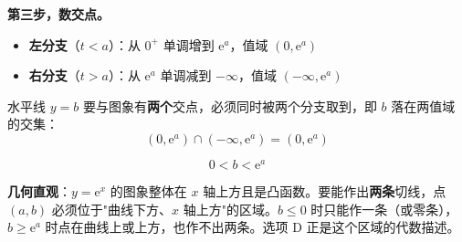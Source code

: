 \begin{answer}
\textbf{第三步，数交点。}

\begin{itemize}
\item \textbf{左分支}（$t<a$）：从 $0^{+}$ 单调增到 $\mathrm e^{a}$，值域 $\left(0,\mathrm e^{a}\right)$
\item \textbf{右分支}（$t>a$）：从 $\mathrm e^{a}$ 单调减到 $-\infty$，值域 $\left(-\infty,\mathrm e^{a}\right)$
\end{itemize}

水平线 $y=b$ 要与图象有\textbf{两个}交点，必须同时被两个分支取到，即 $b$ 落在两值域的交集：
\nopagebreak[4]
\[\left(0,\mathrm e^{a}\right)\cap\left(-\infty,\mathrm e^{a}\right)=\left(0,\mathrm e^{a}\right)\]

\nopagebreak[4]
\[0<b<\mathrm e^{a}\]

\begin{gktip}
\textbf{几何直观}：$y=\mathrm e^{x}$ 的图象整体在 $x$ 轴上方且是凸函数。要能作出\textbf{两条}切线，点 $(a,b)$ 必须位于"曲线下方、$x$ 轴上方"的区域。$b\le0$ 时只能作一条（或零条），$b\ge\mathrm e^{a}$ 时点在曲线上或上方，也作不出两条。选项 D 正是这个区域的代数描述。
\end{gktip}


\par\medskip

\end{answer}

